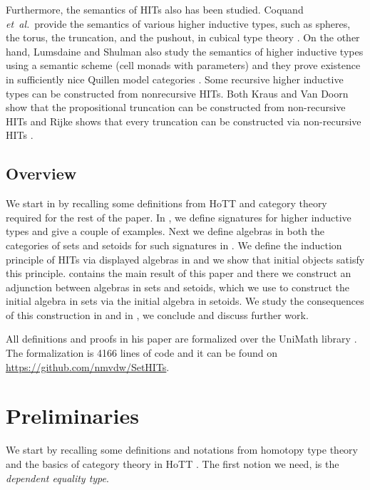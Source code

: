 \documentclass[9pt]{entcs}
\newcommand{\etal}{\emph{et~al.}}
\newcommand{\0}{\textbf{0}} %
\begin{document}
Furthermore, the semantics of HITs also has been studied.
Coquand \etal \ provide the semantics of various higher inductive types, such as spheres, the torus, the truncation, and the pushout, in cubical type theory \cite{BezemCH13,CohenCHM16,CoquandHM18}.
On the other hand, Lumsdaine and Shulman also study the semantics of higher inductive types using a semantic scheme (cell monads with parameters) and they prove existence in sufficiently nice Quillen model categories \cite{lumsdaine2017semantics}.
Some recursive higher inductive types can be constructed from nonrecursive HITs.
Both Kraus and Van Doorn show that the propositional truncation can be constructed from non-recursive HITs \cite{Kraus16,Doorn16} and Rijke shows that every truncation can be constructed via non-recursive HITs \cite{rijke2017join}.

\subsection{Overview}
We start in  by recalling some definitions from HoTT and category theory required for the rest of the paper.
In , we define signatures for higher inductive types and give a couple of examples.
Next we define algebras in both the categories of sets and setoids for such signatures in .
We define the induction principle of HITs via displayed algebras in  and we show that initial objects satisfy this principle.
 contains the main result of this paper and there we construct an adjunction between algebras in sets and setoids, which we use to construct the initial algebra in sets via the initial algebra in setoids.
We study the consequences of this construction in  and in , we conclude and discuss further work.

All definitions and proofs in his paper are formalized over the UniMath library \cite{UniMath}.
The formalization is 4166 lines of code and it can be found on \url{https://github.com/nmvdw/SetHITs}.

\section{Preliminaries}
\label{sec:prelim}
We start by recalling some definitions and notations from homotopy type theory and the basics of category theory in HoTT \cite{AhrensKS15,mac2013categories,hottbook}.
The first notion we need, is the \emph{dependent equality type}.
\end{document}
